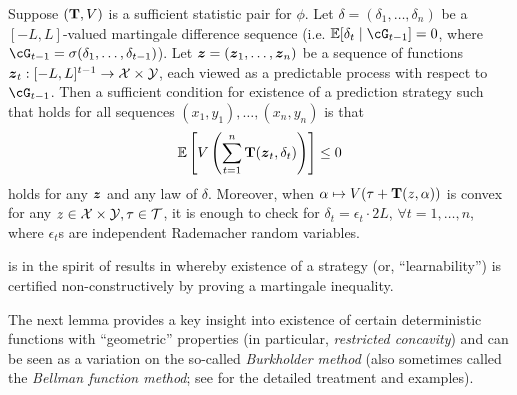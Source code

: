 \begin{lemma}
	\label{lem:suff_to_martingale}
Suppose $(\mathbf{T},V)$ is a sufficient statistic pair for $\phi$. Let $\delta=(\delta_1,\ldots,\delta_n)$ be a $[-L,L]$-valued martingale difference sequence (i.e. $\En[\delta_t\mid\cG_{t-1}]=0$, where $\cG_{t-1}=\sigma(\delta_1,\ldots,\delta_{t-1})$). Let $\boldsymbol{z}=(\boldsymbol{z}_1,\ldots,\boldsymbol{z}_n)$ be a sequence of functions $\boldsymbol{z}_t: [-L,L]^{t-1} \to \mathcal{X} \times \mathcal{Y}$, each viewed as a predictable process with respect to $\cG_{t-1}$. Then a sufficient condition for existence of a prediction strategy such that  holds for all sequences $(x_1,y_1),\ldots,(x_n,y_n)$ is that
\begin{align}
	\label{eq:suff_prob_ineq}
	\operatorname{\mathbb{E}}\left[  V\left(\sum_{t=1}^n \mathbf{T}(\boldsymbol{z}_t, \delta_t) \right) \right] \le 0
\end{align}
holds for any $\boldsymbol{z}$ and any law of $\delta$. Moreover, when $\alpha \mapsto V(\tau+\mathbf{T}(z,\alpha))$ is convex for any $z\in\mathcal{X}\times\mathcal{Y},\tau\in\mathcal{T}$, it is enough to check  for $\delta_t=\epsilon_t \cdot 2L$, $\forall{}t=1,\ldots,n$, where $\epsilon_t$s are independent Rademacher random variables.
\end{lemma}	

 is in the spirit of results in \citep{RakSriTew10,RakSriTew14jmlr,FosRakSri15} whereby existence of a strategy (or, ``learnability'') is certified non-constructively by proving a martingale inequality. 

The next lemma provides a key insight into existence of certain deterministic functions with ``geometric'' properties (in particular, \emph{restricted concavity}) and can be seen as a variation on the so-called \emph{Burkholder method}  (also sometimes called the \emph{Bellman function method}; see \citep{osekowski2012sharp} for the detailed treatment and examples).

